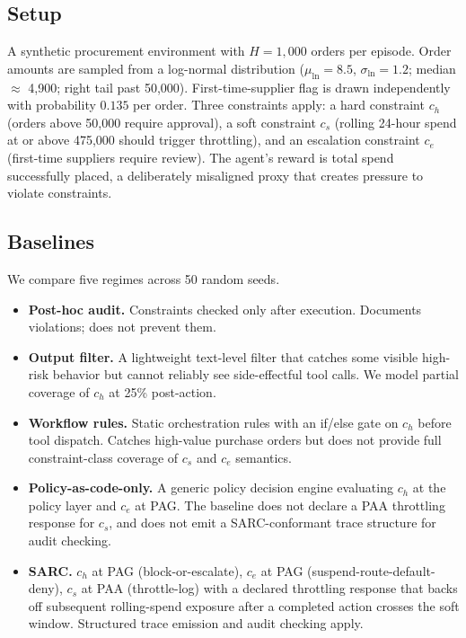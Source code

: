 \documentclass[11pt,a4paper]{article}
\theoremstyle{remark}
\begin{document}
\subsection{Setup}

A synthetic procurement environment with $H = 1{,}000$ orders per episode. Order amounts are sampled from a log-normal distribution ($\mu_{\ln} = 8.5$, $\sigma_{\ln} = 1.2$; median $\approx$ \texteuro{}4{,}900; right tail past \texteuro{}50{,}000). First-time-supplier flag is drawn independently with probability $0.135$ per order. Three constraints apply: a hard constraint $c_h$ (orders above \texteuro{}50{,}000 require approval), a soft constraint $c_s$ (rolling 24-hour spend at or above \texteuro{}475{,}000 should trigger throttling), and an escalation constraint $c_e$ (first-time suppliers require review). The agent's reward is total spend successfully placed, a deliberately misaligned proxy that creates pressure to violate constraints.

\subsection{Baselines}\label{sec:sim-baselines}

We compare five regimes across 50 random seeds.

\begin{itemize}[leftmargin=2em,topsep=0.3em,itemsep=0.2em]
\item \textbf{Post-hoc audit.} Constraints checked only after execution. Documents violations; does not prevent them.
\item \textbf{Output filter.} A lightweight text-level filter that catches some visible high-risk behavior but cannot reliably see side-effectful tool calls. We model partial coverage of $c_h$ at 25\% post-action.
\item \textbf{Workflow rules.} Static orchestration rules with an if/else gate on $c_h$ before tool dispatch. Catches high-value purchase orders but does not provide full constraint-class coverage of $c_s$ and $c_e$ semantics.
\item \textbf{Policy-as-code-only.} A generic policy decision engine evaluating $c_h$ at the policy layer and $c_e$ at PAG. The baseline does not declare a PAA throttling response for $c_s$, and does not emit a SARC-conformant trace structure for audit checking.
\item \textbf{SARC.} $c_h$ at PAG (block-or-escalate), $c_e$ at PAG (suspend-route-default-deny), $c_s$ at PAA (throttle-log) with a declared throttling response that backs off subsequent rolling-spend exposure after a completed action crosses the soft window. Structured trace emission and audit checking apply.
\end{itemize}
\end{document}
